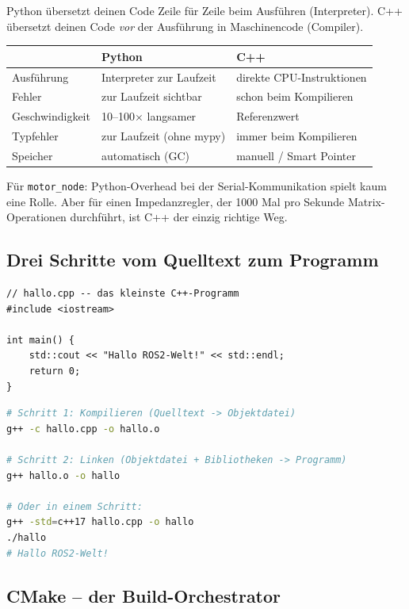 \begin{wissenBox}
Python übersetzt deinen Code Zeile für Zeile beim Ausführen (Interpreter).
C++ übersetzt deinen Code \emph{vor} der Ausführung in Maschinencode (Compiler).

\begin{center}
\begin{tabular}{lll}
\hline
\textbf{} & \textbf{Python} & \textbf{C++} \\
\hline
Ausführung & Interpreter zur Laufzeit & direkte CPU-Instruktionen \\
Fehler & zur Laufzeit sichtbar & schon beim Kompilieren \\
Geschwindigkeit & 10--100$\times$ langsamer & Referenzwert \\
Typfehler & zur Laufzeit (ohne mypy) & immer beim Kompilieren \\
Speicher & automatisch (GC) & manuell / Smart Pointer \\
\hline
\end{tabular}
\end{center}

Für \texttt{motor\_node}: Python-Overhead bei der Serial-Kommunikation
spielt kaum eine Rolle. Aber für einen Impedanzregler,
der 1000 Mal pro Sekunde Matrix-Operationen durchführt,
ist C++ der einzig richtige Weg.
\end{wissenBox}

\subsection{Drei Schritte vom Quelltext zum Programm}

\begin{lstlisting}[style=cpp]
// hallo.cpp -- das kleinste C++-Programm
#include <iostream>

int main() {
    std::cout << "Hallo ROS2-Welt!" << std::endl;
    return 0;
}
\end{lstlisting}

\begin{lstlisting}[language=bash]
# Schritt 1: Kompilieren (Quelltext -> Objektdatei)
g++ -c hallo.cpp -o hallo.o

# Schritt 2: Linken (Objektdatei + Bibliotheken -> Programm)
g++ hallo.o -o hallo

# Oder in einem Schritt:
g++ -std=c++17 hallo.cpp -o hallo
./hallo
# Hallo ROS2-Welt!
\end{lstlisting}

\subsection{CMake -- der Build-Orchestrator}

